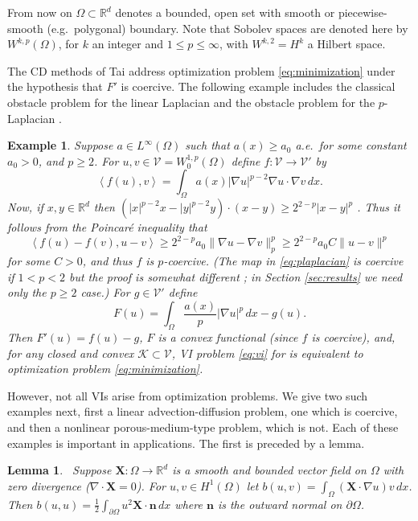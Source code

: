 \documentclass[letterpaper,final,12pt,reqno]{amsart}
\theoremstyle{cstyle}
\newtheorem{lemma}[theorem]{Lemma}
\theoremstyle{cstyle*}
\theoremstyle{dstyle}
\newtheorem{example}[theorem]{Example}
\numberwithin{equation}{section}
\numberwithin{figure}{section}
\numberwithin{table}{section}
\numberwithin{theorem}{section}
\newcommand{\RR}{\mathbb{R}}
\newcommand{\grad}{\nabla}
\newcommand{\Div}{\nabla\cdot}
\newcommand{\bn}{\mathbf{n}}
\newcommand{\bX}{\mathbf{X}}
\newcommand{\cK}{\mathcal{K}}
\newcommand{\cV}{\mathcal{V}}
\newcommand{\ip}[2]{\left<#1,#2\right>}
\begin{document}
From now on $\Omega \subset \RR^d$ denotes a bounded, open set with smooth or piecewise-smooth (e.g.~polygonal) boundary.  Note that Sobolev spaces \cite{Evans2010} are denoted here by $W^{k,p}(\Omega)$, for $k$ an integer and $1\le p \le \infty$, with $W^{k,2}=H^k$ a Hilbert space.

The CD methods of Tai \cite{Tai2003} address optimization problem \eqref{eq:minimization} under the hypothesis that $F'$ is coercive.  The following example includes the classical obstacle problem for the linear Laplacian \cite{GraeserKornhuber2009} and the obstacle problem for the $p$-Laplacian \cite{ChoeLewis1991}.

\begin{example}  \label{ex:plaplacian}  Suppose $a\in L^\infty(\Omega)$ such that $a(x)\ge a_0$ a.e.~for some constant $a_0>0$, and $p\ge 2$.  For $u,v \in \cV = W^{1,p}_0(\Omega)$ define $f:\cV \to \cV'$ by
\begin{equation}
\ip{f(u)}{v} = \int_\Omega a(x) |\grad u|^{p-2} \grad u \cdot \grad v\,dx. \label{eq:plaplacian}
\end{equation}
Now, if $x,y\in\RR^d$ then $(|x|^{p-2} x - |y|^{p-2} y)\cdot (x-y) \ge 2^{2-p} |x-y|^p$ \cite[see Appendix A and references therein]{Bueler2021conservation}.  Thus it follows from the Poincar\'e inequality that
    $$\ip{f(u) - f(v)}{u-v} \ge 2^{2-p} a_0 \|\grad u - \grad v\|_p^p \ge 2^{2-p} a_0 C \|u-v\|^p$$
for some $C>0$, and thus $f$ is $p$-coercive.  (The map in \eqref{eq:plaplacian} is coercive if $1<p<2$ but the proof is somewhat different \cite[Theorem 4.4]{Bueler2021conservation}; in Section \ref{sec:results} we need only the $p\ge 2$ case.)  For $g\in\cV'$ define
    $$F(u) = \int_\Omega \frac{a(x)}{p} |\grad u|^p\,dx - g(u).$$
Then $F'(u) = f(u) - g$, $F$ is a convex functional (since $f$ is coercive), and, for any closed and convex $\cK\subset \cV$, VI problem \eqref{eq:vi} for is equivalent to optimization problem \eqref{eq:minimization}.
\end{example}

However, not all VIs arise from optimization problems.  We give two such examples next, first a linear advection-diffusion problem, one which is coercive, and then a nonlinear porous-medium-type problem, which is not.  Each of these examples is important in applications.  The first is preceded by a lemma.

\begin{lemma}  \label{lem:advectionskew}  \cite{Elmanetal2014}\,  Suppose $\bX :\Omega \to \RR^d$ is a smooth and bounded vector field on $\Omega$ with zero divergence ($\Div \bX=0$).  For $u,v \in H^1(\Omega)$ let $b(u,v) = \int_\Omega (\bX \cdot \grad u) v\,dx$.  Then $b(u,u) = \frac{1}{2} \int_{\partial \Omega} u^2 \bX\cdot \bn\,dx$ where $\bn$ is the outward normal on $\partial \Omega$.
\end{lemma}
\end{document}
